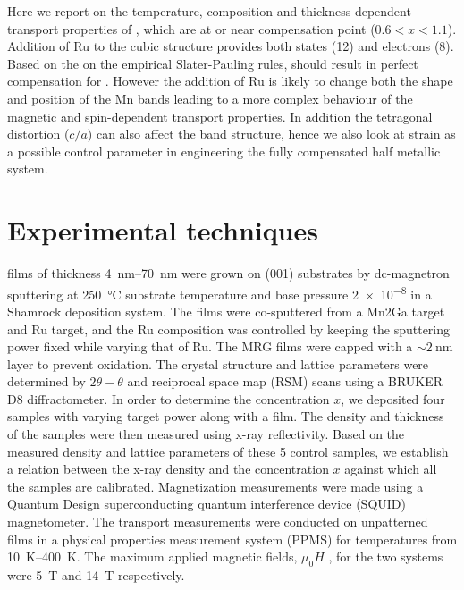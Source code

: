 \documentclass[reprint,aip,apl,floatfix,linenumbers,superscriptaddress]{revtex4-1}
\begin{document}
Here we report on the temperature, composition and thickness dependent 
transport properties of , which are at or near compensation point ($0.
6<x<1.1$). Addition of Ru to the cubic  structure provides both 
states (\num{12}) and electrons (\num{8}). Based on the on the empirical 
Slater-Pauling rules, should result in perfect compensation for . However the addition of Ru is likely to change both the shape and 
position of the Mn bands leading to a more complex behaviour of the magnetic 
and spin-dependent transport properties. In addition the tetragonal 
distortion ($c/a$) can also affect the band structure, hence we also look at 
strain as a possible control parameter in engineering the  fully 
compensated half metallic system.


\section{Experimental techniques}
\label{sec:exp_tech}

 films of thickness \SIrange{4}{70}{\nano\metre} were grown on  (001) substrates by dc-magnetron sputtering at \SI{250}{\celsius} substrate 
temperature and base pressure \SI{2e-8}{\torr} in a Shamrock deposition 
system. The films were co-sputtered from a Mn2Ga target and Ru target, and 
the Ru composition was controlled by keeping the  sputtering power 
fixed while varying that of Ru. The MRG films were capped with a  $\sim \SI{2
}{\nano\metre}$  layer to prevent oxidation.  The crystal structure 
and lattice parameters were determined by $2\theta-\theta$ and reciprocal 
space map (RSM) scans using a BRUKER D8 diffractometer. In order to determine 
the  concentration $x$, we deposited four samples with varying  target power along with a  film. The density and thickness of the 
samples were then measured using x-ray reflectivity. Based on the measured 
density and lattice parameters of these 5 control samples, we establish a 
relation between the x-ray density and the  concentration $x$ against 
which all the samples are calibrated. Magnetization measurements were made 
using a Quantum Design superconducting quantum interference device (SQUID) 
magnetometer. The transport measurements were conducted on unpatterned  films in a physical properties measurement system (PPMS) for temperatures 
from \SIrange{10}{400}{\kelvin}. The maximum applied magnetic fields, $\mu_0H$
, for the two systems were \SI{5}{\tesla} and \SI{14}{\tesla} respectively. 
\end{document}
